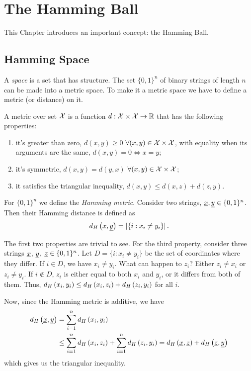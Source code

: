 \chapter{The Hamming Ball}

This Chapter introduces an important concept: the Hamming Ball.

\section{Hamming Space}

A \emph{space} is a set that has structure.
The set $\{0,1\}^{n}$ of binary strings of length $n$ can be made into a metric space.
To make it a metric space we have to define a metric (or distance) on it.

A metric over set $\mathcal{X}$ is a function $d: \mathcal{X} \times \mathcal{X} \rightarrow \mathbb{R}$ that has the following properties:
\begin{enumerate}
	\item it's greater than zero, \ie $d(x, y) \geq 0$ $\forall (x, y) \in \mathcal{X} \times \mathcal{X}$, with equality when its arguments are the same, \ie $d(x, y) = 0 \iff x = y$;
	\item it's symmetric, \ie $d(x, y) = d(y, x)$ $\forall (x, y) \in \mathcal{X} \times \mathcal{X}$;
	\item it satisfies the triangular inequality, \ie $d(x, y) \leq d(x, z) + d(z, y)$.
\end{enumerate}

For $\{0,1\}^{n}$ we define the \emph{Hamming metric}.
Consider two strings, $\underline{x}, \underline{y}  \in \{0, 1\}^n$.
Then their Hamming distance is defined as
\begin{equation}
	d_H \left({\underline{x}, \underline{y}}\right) = \left|{\{i : x_i \neq y_i\}}\right|.
\end{equation}

The first two properties are trivial to see.
For the third property, consider three strings $\underline{x}$, $\underline{y}$, $\underline{z} \in \{0,1\}^n$.
Let $D = \{i : x_i \neq y_i\}$ be the set of coordinates where they differ.
If $i \in D$, we have $x_{i} \neq y_{i}$.
What can happen to $z_{i}$?
Either $z_{i} \neq x_{i}$ or $z_{i} \neq y_{i}$.
If $i \not\in D$, $z_{i}$ is either equal to both $x_{i}$ and $y_{i}$, or it differs from both of them.
Thus, $d_H \left({x_{i},y_{i}}\right) \le d_H \left({x_{i},z_{i}}\right) + d_H \left({z_{i},y_{i}}\right)$ for all $i$.

Now, since the Hamming metric is additive, we have
\begin{align*}
	d_H \left({\underline{x},\underline{y}}\right) & =
	\sum_{i = 1}^n d_H \left({x_i,y_i}\right) \\
	& \le
	\sum_{i = 1}^n d_H \left({x_i,z_i}\right) +
	\sum_{i = 1}^n d_H \left({z_i,y_i}\right)
	=
	d_H \left({\underline{x},\underline{z}}\right) +
	d_H \left({\underline{z},\underline{y}}\right)
\end{align*}
which gives us the triangular inequality.

